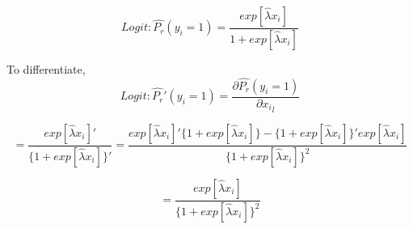 $$Logit: \widehat{P_r}(y_i = 1) = \frac{exp[\widehat{λ}x_i]}{1 + exp[\widehat{λ}x_i]}$$

To differentiate,
$$Logit: \widehat{P_r}'(y_i = 1) = \frac{\partial{\widehat{P_r}(y_i = 1)}}{\partial{{x_i}_l}}$$

$$ = \frac{exp[\widehat{λ}x_i]'}{\{ 1 + exp[\widehat{λ}x_i]\}'}  = \frac{exp[\widehat{λ}x_i]'\{ 1 + exp[\widehat{λ}x_i]\} - \{ 1 + exp[\widehat{λ}x_i]\}'exp[\widehat{λ}x_i]}{\{ 1 + exp[\widehat{λ}x_i]\}^2}$$

$$= \frac{exp[\widehat{λ}x_i]}{\{ 1 + exp[\widehat{λ}x_i]\}^2}$$
